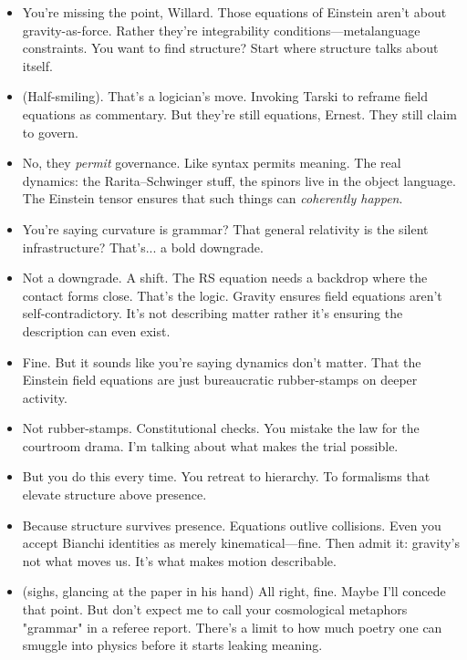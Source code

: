 \begin{itemize}[leftmargin=2cm, label={}]

\item[\textbf{Ernest:}]  
You’re missing the point, Willard. Those equations of Einstein aren’t about gravity-as-force. Rather they’re integrability conditions—metalanguage constraints. You want to find structure? Start where structure talks about itself.

\item[\textbf{Willard:}]  (Half-smiling).
That’s a logician’s move. Invoking Tarski to reframe field equations as commentary. But they’re still equations, Ernest. They still claim to govern.

\item[\textbf{Ernest:}]  
No, they \textit{permit} governance. Like syntax permits meaning. The real dynamics: the Rarita–Schwinger stuff, the spinors live in the object language. The Einstein tensor ensures that such things can \textit{coherently happen}.

\item[\textbf{Willard:}]  
You're saying curvature is grammar? That general relativity is the silent infrastructure? That’s... a bold downgrade.

\item[\textbf{Ernest:}]  
Not a downgrade. A shift. The RS equation needs a backdrop where the contact forms close. That’s the logic. Gravity ensures field equations aren't self-contradictory. It’s not describing matter rather it’s ensuring the description can even exist.

\item[\textbf{Willard:}]  
Fine. But it sounds like you're saying dynamics don’t matter. That the Einstein field equations are just bureaucratic rubber-stamps on deeper activity. 

\item[\textbf{Ernest:}]
Not rubber-stamps. Constitutional checks. You mistake the law for the courtroom drama. I’m talking about what makes the trial possible.

\item[\textbf{Willard:}]  
But you do this every time. You retreat to hierarchy. To formalisms that elevate structure above presence. 

\item[\textbf{Ernest:}]  
Because structure survives presence. Equations outlive collisions. Even you accept Bianchi identities as merely kinematical—fine. Then admit it: gravity’s not what moves us. It’s what makes motion describable. 

\item[\textbf{Willard:}]  
(sighs, glancing at the paper in his hand)  
All right, fine. Maybe I’ll concede that point.  
But don’t expect me to call your cosmological metaphors "grammar" in a referee report.  
There’s a limit to how much poetry one can smuggle into physics before it starts leaking meaning.

\end{itemize}

